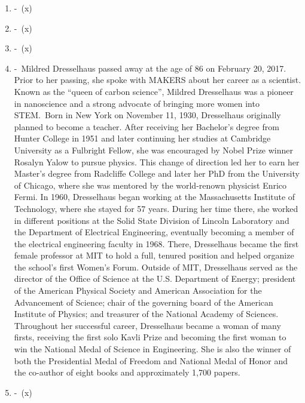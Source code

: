 \documentclass[12pt,a4paper]{article}
\begin{document}
\begin{enumerate}
    \item {} -\ (x) %
    \item {} -\ (x) %
    \item {} -\ (x) %
    \item {} -\ Mildred Dresselhaus passed away at the age of 86 on February 20, 2017. Prior to her passing, she spoke with MAKERS about her career as a scientist. Known as the ``queen of carbon science'', Mildred Dresselhaus was a pioneer in nanoscience and a strong advocate of bringing more women into STEM.\ Born in New York on November 11, 1930, Dresselhaus originally planned to become a teacher. After receiving her Bachelor's degree from Hunter College in 1951 and later continuing her studies at Cambridge University as a Fulbright Fellow, she was encouraged by Nobel Prize winner Rosalyn Yalow to pursue physics. This change of direction led her to earn her Master's degree from Radcliffe College and later her PhD from the University of Chicago, where she was mentored by the world-renown physicist Enrico Fermi. In 1960, Dresselhaus began working at the Massachusetts Institute of Technology, where she stayed for 57 years. During her time there, she worked in different positions at the Solid State Division of Lincoln Laboratory and the Department of Electrical Engineering, eventually becoming a member of the electrical engineering faculty in 1968. There, Dresselhaus became the first female professor at MIT to hold a full, tenured position and helped organize the school's first Women's Forum. Outside of MIT, Dresselhaus served as the director of the Office of Science at the U.S. Department of Energy; president of the American Physical Society and American Association for the Advancement of Science; chair of the governing board of the American Institute of Physics; and treasurer of the National Academy of Sciences. Throughout her successful career, Dresselhaus became a woman of many firsts, receiving the first solo Kavli Prize and becoming the first woman to win the National Medal of Science in Engineering. She is also the winner of both the Presidential Medal of Freedom and National Medal of Honor and the co-author of eight books and approximately 1,700 papers. 
    \item {} -\ (x) %

\end{enumerate}
\end{document}
